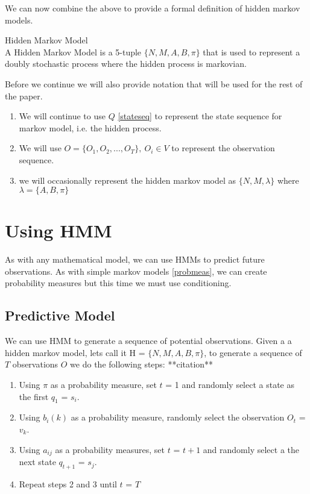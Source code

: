 We can now combine the above to provide a formal definition of hidden markov models.
\begin{definition}
\label{hmm} Hidden Markov Model \\
A Hidden Markov Model is a 5-tuple $\{N,M,A,B,\pi \}$ that is used to represent a doubly stochastic process where the hidden process is markovian. 
\end{definition}

Before we continue we will also provide notation that will be used for the rest of the paper.
\begin{enumerate}[i]
    \item We will continue to use $Q$ \ref{stateseq} to represent the state sequence for markov model, i.e. the hidden process.
    \item We will use $O = \{O_1,O_2,...,O_T\} ,\ O_i \in V$ to represent the observation sequence.
    \item we will occasionally represent the hidden markov model as $\{N,M, \lambda \}$ where $\lambda = \{A, B, \pi\}$ 
\end{enumerate}


\section{Using HMM}
As with any mathematical model, we can use HMMs to predict future observations. As with simple markov models \ref{probmeas}, we can create probability measures but this time we must use conditioning. 

\subsection{Predictive Model}
 We can use HMM to generate a sequence of potential observations. Given a a hidden markov model, lets call it H = $\{N,M,A,B,\pi\}$, to generate a sequence of $T$ observations $O$ we do the following steps: **citation**
 \begin{enumerate}
    \label{hmmpredict}
     \item Using $\pi$ as a probability measure, set $t$ = 1 and randomly select a state as the first $q_1$ = $s_i$.
     \item Using $b_i(k)$ as a probability measure, randomly select the observation $O_t$ = $v_k$.
     \item Using $a_{ij}$ as a probability measures, set $t$ = $t+1$ and randomly select a the next state $q_{t+1}$ = $s_j$.
     \item Repeat steps 2 and 3 until $t$ = $T$
 \end{enumerate}

